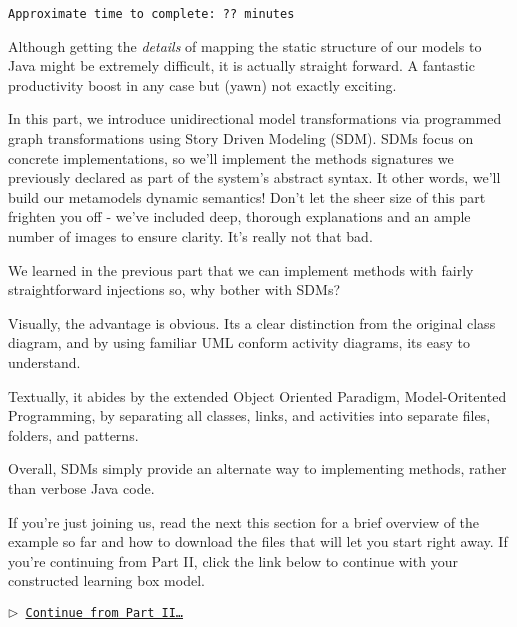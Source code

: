 \genHeader

{\scriptsize \texttt{Approximate time to complete: ?? minutes} }


Although getting the \emph{details} of mapping the static structure of our models to Java might be extremely difficult, it is actually straight forward.
A fantastic productivity boost in any case but (yawn) not exactly exciting.

In this part, we introduce unidirectional model transformations via programmed graph transformations using Story Driven Modeling (SDM). SDMs focus on concrete
implementations, so we'll implement the methods signatures we previously declared as part of the system's abstract syntax. It other words, we'll build our
metamodels dynamic semantics! Don't let the sheer size of this part frighten you off - we've included deep, thorough explanations and an ample number of
images to ensure clarity. It's really not that bad.

We learned in the previous part that we can implement methods with fairly straightforward injections so, why bother with SDMs?

Visually, the advantage is obvious. Its a clear distinction from the original class diagram, and by using familiar UML conform activity diagrams, its easy to
understand.

Textually, it abides by the extended Object Oriented Paradigm, Model-Oritented Programming, by separating all classes, links, and activities into separate
files, folders, and patterns.

Overall, SDMs simply provide an alternate way to implementing methods, rather than verbose Java code.

If you're just joining us, read the next this section for a brief overview of the example so far and how to download the files that will let you start right away. 
If you're continuing from Part II, click the link below to continue with your constructed learning box model.

\begin{center}\texttt{$\triangleright$ \hyperlink{explanation}{Continue from Part II\ldots}}\end{center}
